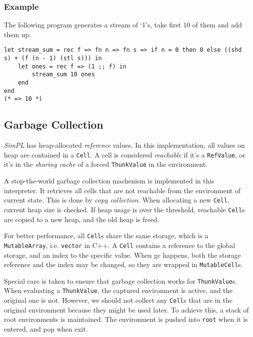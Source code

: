 \documentclass[a4paper]{article}
\begin{document}
\subsubsection{Example}

The following program generates a stream of `1's, take first 10 of them and add them up.

\begin{verbatim}
let stream_sum = rec f => fn n => fn s => if n = 0 then 0 else ((shd s) + (f (n - 1) (stl s))) in
    let ones = rec f => (1 ;; f) in
        stream_sum 10 ones
    end
end
(* => 10 *)
\end{verbatim}

\subsection{Garbage Collection}

\textit{SimPL} has heap-allocated \textit{reference} values. In this implementation, all values on heap are contained in a \texttt{Cell}. A cell is considered \textit{reachable} if it's a \texttt{RefValue}, or it's in the \textit{sharing cache} of a forced \texttt{ThunkValue} in the environment.

A stop-the-world garbage collection machenism is implemented in this interpreter. It retrieves all cells that are not reachable from the environment of current state. This is done by \textit{copy collection}.
When allocating a new \texttt{Cell}, current heap size is checked. If heap usage is over the threshold, reachable \texttt{Cell}s are copied to a new heap, and the old heap is freed.

For better performance, all \texttt{Cell}s share the same storage, which is a \texttt{MutableArray}, i.e. \texttt{vector} in C++. A \texttt{Cell} contains a reference to the global storage, and an index to the specific value. When gc happens, both the storage reference and the index may be changed, so they are wrapped in \texttt{MutableCell}s.

Special care is taken to ensure that garbage collection works for \texttt{ThunkValue}s.
When evaluating a \texttt{ThunkValue}, the captured environment is active, and the original one is not. However, we should not collect any \texttt{Cell}s that are in the original environment because they might be used later. To achieve this, a stack of root environments is maintained. The environment is pushed into \texttt{root} when it is entered, and pop when exit.
\end{document}
